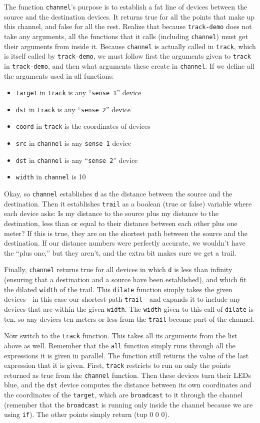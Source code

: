 \documentclass{article}
\newcommand\var[1]{{\tt #1}}
\newcommand\qvar[1]{``{\tt #1}''}
\begin{document}
The function \var{channel}'s purpose is to establish a fat line of
devices between the source and the destination devices.  It returns
true for all the points that make up this channel, and false for all
the rest.  Realize that because \var{track-demo} does not take any
arguments, all the functions that it calls (including \var{channel})
must get their arguments from inside it.  Because \var{channel} is
actually called in \var{track}, which is itself called by
\var{track-demo}, we must follow first the arguments given to
\var{track} in \var{track-demo}, and then what arguments these create
in \var{channel}.  If we define all the arguments used in all
functions:
\begin{itemize}
\item \var{target} in \var{track} is any \qvar{sense 1} device
\item \var{dst} in \var{track} is any \qvar{sense 2} device
\item \var{coord} in \var{track} is the coordinates of devices
\item \var{src} in \var{channel} is any \var{sense 1} device
\item \var{dst} in \var{channel} is any \qvar{sense 2} device
\item \var{width} in \var{channel} is 10
\end{itemize}

Okay, so \var{channel} establishes \var{d} as the distance between the
source and the destination.  Then it establishes \var{trail} as a
boolean (true or false) variable where each device asks: Is my
distance to the source plus my distance to the destination, less than
or equal to their distance between each other plus one meter?  If this
is true, they are on the shortest path between the source and the
destination.  If our distance numbers were perfectly accurate, we
wouldn't have the ``plus one,'' but they aren't, and the extra bit
makes sure we get a trail.

Finally, \var{channel} returns true for all devices in which \var{d}
is less than infinity (ensuring that a destination and a source have
been established), and which fit the dilated \var{width} of the
trail. This \var{dilate} function simply takes the given devices---in
this case our shortest-path \var{trail}---and expands it to include
any devices that are within the given \var{width}. The \var{width}
given to this call of \var{dilate} is ten, so any devices ten meters
or less from the \var{trail} become part of the channel.

Now switch to the \var{track} function.  This takes all its arguments
from the list above as well.  Remember that the \var{all} function
simply runs through all the expressions it is given in parallel.  The
function still returns the value of the last expression that it is
given.  First, \var{track} restricts to run on only the points
returned as true from the \var{channel} function.  Then these devices
turn their LEDs blue, and the \var{dst} device computes the distance
between its own coordinates and the coordinates of the \var{target},
which are \var{broadcast} to it through the channel (remember that the
\var{broadcast} is running only inside the channel because we are
using \var{if}).  The other points simply return (tup 0 0 0).
\end{document}
